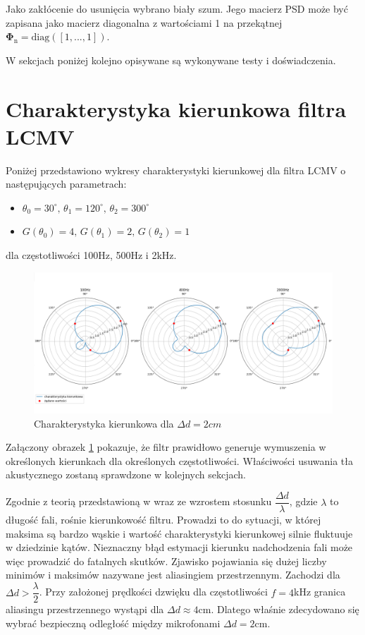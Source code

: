 \noindent Jako zakłócenie do usunięcia wybrano biały szum. Jego macierz PSD może być zapisana jako macierz diagonalna z wartościami 1 na przekątnej $\bm{\Phi}_{\mathrm{n}} = \bm{\mathrm{diag}}([1,...,1])$.

\noindent W sekcjach poniżej kolejno opisywane są wykonywane testy i doświadczenia.

\section{Charakterystyka kierunkowa filtra LCMV}

Poniżej przedstawiono wykresy charakterystyki kierunkowej dla filtra LCMV o następujących parametrach:

\begin{itemize}
    \item $\theta_{0}=30^{\circ}, \,
    \theta_{1}=120^{\circ}, \,
    \theta_{2}=300^{\circ}$
    \item $G(\theta_{0})=4, \,
    G(\theta_{1})=2, \,
    G(\theta_{2})=1$
\end{itemize}
\noindent dla częstotliwości 100Hz, 500Hz i 2kHz.

\begin{figure}[h!]
    \centering
    \includegraphics[width=\textwidth]{Images/directivity0.02m.png}
    \caption{Charakterystyka kierunkowa dla $\Delta d = 2cm$}
    \label{fig:directivity0.02}
\end{figure}

\noindent Załączony obrazek \ref{fig:directivity0.02} pokazuje, że filtr prawidłowo generuje wymuszenia w określonych kierunkach dla określonych częstotliwości. Właściwości usuwania tła akustycznego zostaną sprawdzone w kolejnych sekcjach.

\noindent Zgodnie z teorią przedstawioną w \cite{mccowan2001} wraz ze wzrostem stosunku $\dfrac{\Delta d}{\lambda}$, gdzie $\lambda$ to długość fali, rośnie kierunkowość filtru. Prowadzi to do sytuacji, w której maksima są bardzo wąskie i wartość charakterystyki kierunkowej silnie fluktuuje w dziedzinie kątów. Nieznaczny błąd estymacji kierunku nadchodzenia fali może więc prowadzić do fatalnych skutków. Zjawisko pojawiania się dużej liczby minimów i maksimów nazywane jest aliasingiem przestrzennym. Zachodzi dla $\Delta d > \dfrac{\lambda}{2}$. Przy założonej prędkości dzwięku dla częstotliwości $f = 4$kHz granica aliasingu przestrzennego wystąpi dla $\Delta d \approx 4$cm. Dlatego właśnie zdecydowano się wybrać bezpieczną odległość między mikrofonami $\Delta d = 2$cm.


